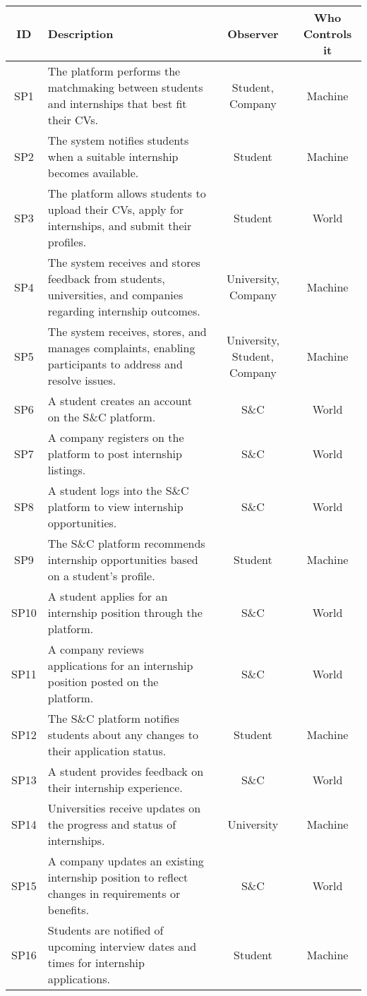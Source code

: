 \begin{longtable}{|c|p{5cm}|c|c|}
\hline
\textbf{ID} & \textbf{Description} & \textbf{Observer} & \textbf{Who Controls it} \\ \hline
SP1 & The platform performs the matchmaking between students and internships that best fit their CVs. & Student, Company & Machine \\ \hline
SP2 & The system notifies students when a suitable internship becomes available. & Student & Machine \\ \hline
SP3 & The platform allows students to upload their CVs, apply for internships, and submit their profiles. & Student & World \\ \hline
SP4 & The system receives and stores feedback from students, universities, and companies regarding internship outcomes.& University, Company & Machine \\ \hline
SP5 & The system receives, stores, and manages complaints, enabling participants to address and resolve issues. & University, Student, Company & Machine \\ \hline
SP6 & A student creates an account on the S\&C platform. & S\&C & World \\ \hline
SP7 & A company registers on the platform to post internship listings.& S\&C & World \\ \hline
SP8 & A student logs into the S\&C platform to view internship opportunities. & S\&C & World \\ \hline
SP9 & The S\&C platform recommends internship opportunities based on a student's profile. & Student & Machine \\ \hline
SP10 & A student applies for an internship position through the platform. & S\&C & World \\ \hline
SP11 & A company reviews applications for an internship position posted on the platform. & S\&C & World \\ \hline
SP12 & The S\&C platform notifies students about any changes to their application status. & Student & Machine \\ \hline
SP13 & A student provides feedback on their internship experience. & S\&C & World \\ \hline
SP14 & Universities receive updates on the progress and status of internships. & University & Machine \\ \hline
SP15 & A company updates an existing internship position to reflect changes in requirements or benefits. & S\&C & World \\ \hline
SP16 & Students are notified of upcoming interview dates and times for internship applications. & Student & Machine \\ \hline

\end{longtable}
